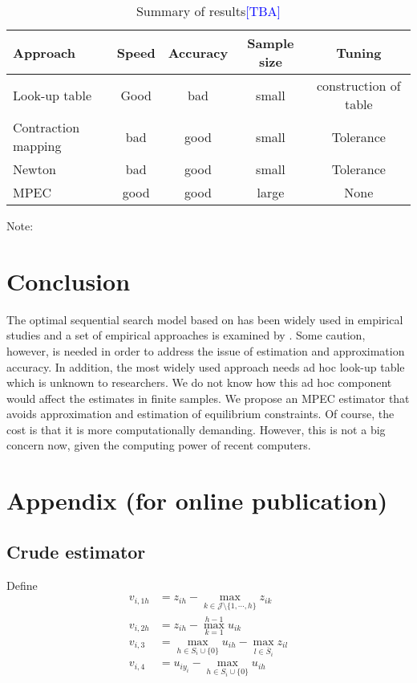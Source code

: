 \documentclass[12pt]{article}
\begin{document}
\begin{table}[!htbp]
  \begin{center}
      \caption{Summary of results\textcolor{blue}{[TBA]}}
      \begin{tabular}{lcccc} \hline
   Approach &  Speed & Accuracy & Sample size & Tuning\\ 
   \hline
   Look-up table &  Good & bad & small & construction of table \\ 
   Contraction mapping & bad & good & small & Tolerance \\ 
   Newton & bad & good & small & Tolerance \\ 
   MPEC & good & good & large & None \\ 
   \hline
 \end{tabular}
 \label{tb:results} 
  \end{center}
  \footnotesize
  Note: 
\end{table} 



\section{Conclusion}
The optimal sequential search model based on \cite{weitzman1979optimal} has been widely used in empirical studies and a set of empirical approaches is examined by \cite{ursu2023sequential}. 
Some caution, however, is needed in order to address the issue of estimation and approximation accuracy.
In addition, the most widely used approach needs ad hoc look-up table which is unknown to researchers.
We do not know how this ad hoc component would affect the estimates
in finite samples. 
We propose an MPEC estimator that avoids approximation and estimation of equilibrium constraints.
Of course, the cost is that it is more computationally demanding.
However, this is not a big concern now, given the computing power
of recent computers.




\newpage
\appendix
\section{Appendix (for online publication)}

\subsection{Crude estimator}

Define
\begin{align}
    v_{i,1h} &= z_{ih} - \max_{k \in \mathcal{J}\setminus \{1,\cdots,h\}} z_{ik} \label{v1}\\
    v_{i,2h} &=  z_{ih} - \max_{k = 1}^{h-1} u_{ik} \label{v2} \\
    v_{i,3} &= \max_{h \in S_i \cup \{0\}} u_{ih} - \max_{l \in \bar{S}_i} z_{il} \label{v3}\\
    v_{i,4} &= u_{iy_i} - \max_{h \in S_i \cup \{0\}} u_{ih}  \label{v4}
\end{align}
\end{document}
